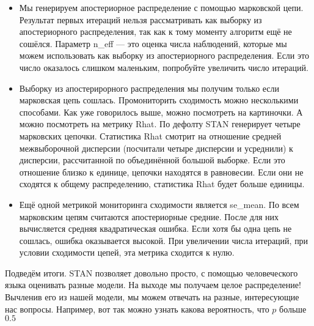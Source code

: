 \begin{itemize}
\item  Мы генерируем апостериорное распределение с помощью марковской цепи. Результат первых итераций нельзя рассматривать как выборку из апостериорного распределения, так как к тому моменту алгоритм ещё не сошёлся. Параметр n\_eff ---  это оценка числа наблюдений, которые мы можем использовать как выборку из апостериорного распределения. Если это число оказалось слишком маленьким, попробуйте увеличить число итераций. 

\item Выборку из апостерирорного распределения мы получим только если марковская цепь сошлась. Промониторить сходимость можно несколькими способами. Как уже говорилось выше, можно посмотреть на картиночки. А можно посмотреть на метрику Rhat. По дефолту STAN генерирует четыре марковских цепочки. Статистика Rhat смотрит на отношение средней межвыборочной дисперсии (посчитали четыре дисперсии и усреднили) к дисперсии, рассчитанной по объединённой большой выборке. Если это отношение близко к единице, цепочки находятся в равновесии. Если они не сходятся к общему распределению, статистика Rhat будет больше единицы. 

\item Ещё одной метрикой мониторинга сходимости является se\_mean.  По всем марковским цепям считаются апостериорные средние. После для них вычисляется средняя квадратическая ошибка. Если хотя бы одна цепь не сошлась, ошибка оказывается высокой. При увеличении числа итераций, при условии сходимости цепей, эта метрика сходится к нулю. 



\end{itemize} 

Подведём итоги. STAN позволяет довольно просто, с помощью человеческого языка оценивать разные модели. На выходе мы получаем целое распределение! Вычленив его из нашей модели, мы можем отвечать на разные, интересующие нас вопросы. Например, вот так можно узнать какова вероятность, что $p$ больше $0.5$

